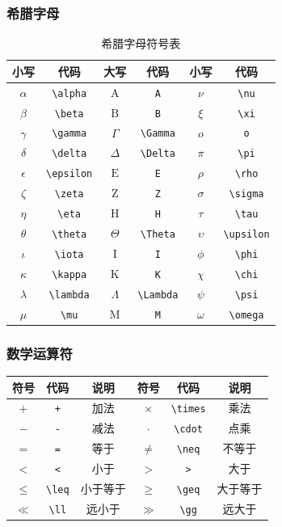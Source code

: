 \documentclass{article}
\begin{document}
\subsubsection{希腊字母}
\begin{table}[h]
\centering
\begin{tabular}{|c|c|c|c|c|c|}
\hline
小写 & 代码 & 大写 & 代码 & 小写 & 代码 \\
\hline
$\alpha$ & \verb|\alpha| & $\mathrm{A}$ & \verb|A| & $\nu$ & \verb|\nu| \\
$\beta$ & \verb|\beta| & $\mathrm{B}$ & \verb|B| & $\xi$ & \verb|\xi| \\
$\gamma$ & \verb|\gamma| & $\Gamma$ & \verb|\Gamma| & $o$ & \verb|o| \\
$\delta$ & \verb|\delta| & $\Delta$ & \verb|\Delta| & $\pi$ & \verb|\pi| \\
$\epsilon$ & \verb|\epsilon| & $\mathrm{E}$ & \verb|E| & $\rho$ & \verb|\rho| \\
$\zeta$ & \verb|\zeta| & $\mathrm{Z}$ & \verb|Z| & $\sigma$ & \verb|\sigma| \\
$\eta$ & \verb|\eta| & $\mathrm{H}$ & \verb|H| & $\tau$ & \verb|\tau| \\
$\theta$ & \verb|\theta| & $\Theta$ & \verb|\Theta| & $\upsilon$ & \verb|\upsilon| \\
$\iota$ & \verb|\iota| & $\mathrm{I}$ & \verb|I| & $\phi$ & \verb|\phi| \\
$\kappa$ & \verb|\kappa| & $\mathrm{K}$ & \verb|K| & $\chi$ & \verb|\chi| \\
$\lambda$ & \verb|\lambda| & $\Lambda$ & \verb|\Lambda| & $\psi$ & \verb|\psi| \\
$\mu$ & \verb|\mu| & $\mathrm{M}$ & \verb|M| & $\omega$ & \verb|\omega| \\
\hline
\end{tabular}
\caption{希腊字母符号表}
\end{table}

\subsubsection{数学运算符}
\begin{center}
\begin{tabular}{ccc|ccc}
\hline
\textbf{符号} & \textbf{代码} & \textbf{说明} & \textbf{符号} & \textbf{代码} & \textbf{说明} \\
\hline
$+$ & \verb|+| & 加法 & $\times$ & \verb|\times| & 乘法 \\
$-$ & \verb|-| & 减法 & $\cdot$ & \verb|\cdot| & 点乘 \\
$=$ & \verb|=| & 等于 & $\neq$ & \verb|\neq| & 不等于 \\
$<$ & \verb|<| & 小于 & $>$ & \verb|>| & 大于 \\
$\leq$ & \verb|\leq| & 小于等于 & $\geq$ & \verb|\geq| & 大于等于 \\
$\ll$ & \verb|\ll| & 远小于 & $\gg$ & \verb|\gg| & 远大于 \\
\hline
\end{tabular}
\end{center}
\end{document}
